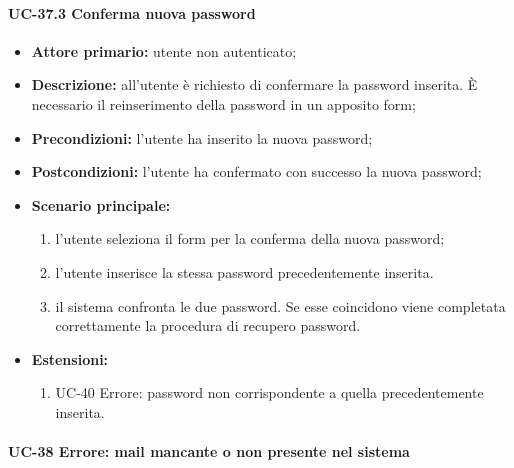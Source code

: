 \paragraph{UC-37.3 Conferma nuova password}

	\begin{itemize}
		\item \textbf{Attore primario:} utente non autenticato;

		\item \textbf{Descrizione:} all'utente è richiesto di confermare la password inserita. \`{E} necessario il reinserimento della password in un apposito form;

		\item \textbf{Precondizioni:} l'utente ha inserito la nuova password;

		\item \textbf{Postcondizioni:} l'utente ha confermato con successo la nuova password;

		\item \textbf{Scenario principale:}
	  		\begin{enumerate}
		  		\item l'utente seleziona il form per la conferma della nuova password;
		  		\item l'utente inserisce la stessa password precedentemente inserita.
		  		\item il sistema confronta le due password. Se esse coincidono viene completata correttamente la procedura di recupero password.
	  		\end{enumerate}
	  	\item \textbf{Estensioni:}
	  		\begin{enumerate}
		  		\item UC-40 Errore: password non corrispondente a quella precedentemente inserita.
	  		\end{enumerate}
	\end{itemize}

\paragraph{UC-38 Errore: mail mancante o non presente nel sistema}

